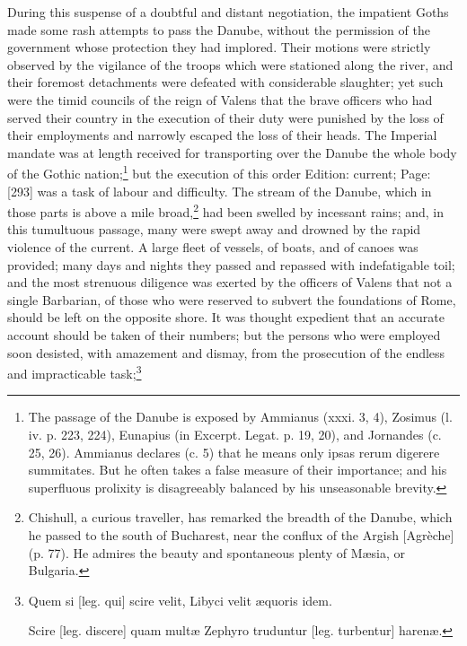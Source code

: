 During this suspense of a doubtful and distant negotiation, the impatient Goths made some rash attempts to pass the Danube, without the permission of the government whose protection they had implored. Their motions were strictly observed by the vigilance of the troops which were stationed along the river, and their foremost detachments were defeated with considerable slaughter; yet such were the timid councils of the reign of Valens that the brave officers who had served their country in the execution of their duty were punished by the loss of their employments and narrowly escaped the loss of their heads. The Imperial mandate was at length received for transporting over the Danube the whole body of the Gothic nation;\footnote{The passage of the Danube is exposed by Ammianus (xxxi. 3, 4), Zosimus (l. iv. p. 223, 224), Eunapius (in Excerpt. Legat. p. 19, 20), and Jornandes (c. 25, 26). Ammianus declares (c. 5) that he means only ipsas rerum digerere summitates. But he often takes a false measure of their importance; and his superfluous prolixity is disagreeably balanced by his unseasonable brevity.} but the execution of this order Edition: current; Page: [293] was a task of labour and difficulty. The stream of the Danube, which in those parts is above a mile broad,\footnote{Chishull, a curious traveller, has remarked the breadth of the Danube, which he passed to the south of Bucharest, near the conflux of the Argish [Agrèche] (p. 77). He admires the beauty and spontaneous plenty of Mæsia, or Bulgaria.} had been swelled by incessant rains; and, in this tumultuous passage, many were swept away and drowned by the rapid violence of the current. A large fleet of vessels, of boats, and of canoes was provided; many days and nights they passed and repassed with indefatigable toil; and the most strenuous diligence was exerted by the officers of Valens that not a single Barbarian, of those who were reserved to subvert the foundations of Rome, should be left on the opposite shore. It was thought expedient that an accurate account should be taken of their numbers; but the persons who were employed soon desisted, with amazement and dismay, from the prosecution of the endless and impracticable task;\footnote{Quem si [leg. qui] scire velit, Libyci velit æquoris idem.

Scire [leg. discere] quam multæ Zephyro truduntur [leg. turbentur] harenæ.

}
